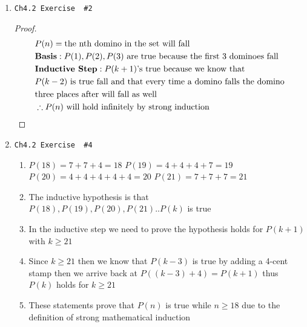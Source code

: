 \documentclass[11pt]{article}
\begin{document}
\begin{enumerate}
    \newpage
    
    \item \begin{verbatim}Ch4.2 Exercise  #2\end{verbatim}
        \begin{proof}
            \begin{align*}
                & P(n) = \text{the nth domino in the set will fall} \\
                & \textbf{Basis}: P(1), P(2), P(3) \text{ are true because the first 3 dominoes fall} \\
                & \textbf{Inductive Step}: P(k+1) \text{'s true because we know that} \\
                & \text{$P(k-2)$ is true fall and that every time a domino falls the domino} \\
                & \text{three places after will fall as well} \\
                & \therefore P(n) \text{ will hold infinitely by strong induction} \qedhere
            \end{align*}
        \end{proof}

    \item \begin{verbatim}Ch4.2 Exercise  #4\end{verbatim}
        \begin{enumerate}
            \item $P(18) = 7 + 7 + 4 = 18$ $P(19) = 4 + 4 + 4 + 7 = 19$\newline
                $P(20) = 4 + 4 + 4 + 4 + 4 = 20$ $P(21) = 7 + 7 + 7 = 21$
            \item The inductive hypothesis is that $P(18), P(19), P(20), P(21) .. P(k)$
                is true
            \item In the inductive step we need to prove the hypothesis holds for
                $P(k+1)$ with $k \ge 21$
            \item Since $k\ge21$ then we know that $P(k-3)$ is true by adding a 4-cent stamp
                then we arrive back at $P((k-3)+4) = P(k+1)$ thus $P(k)$ holds for $k\ge21$
            \item These statements prove that $P(n)$ is true while $n\ge18$ due to the
                definition of strong mathematical induction
        \end{enumerate}

    \newpage


\end{enumerate}
\end{document}
